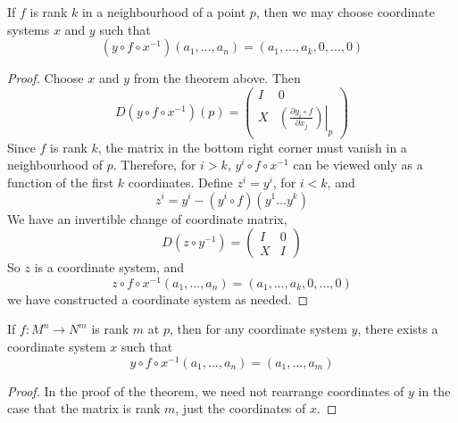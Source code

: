 \begin{corollary}
    If $f$ is rank $k$ in a neighbourhood of a point $p$, then we may choose coordinate systems $x$ and $y$ such that
    \[ (y \circ f \circ x^{-1})(a_1, \dots, a_n) = (a_1, \dots, a_k, 0, \dots, 0) \]
\end{corollary}
\begin{proof}
    Choose $x$ and $y$ from the theorem above. Then
    \[ D(y \circ f \circ x^{-1})(p) = \begin{pmatrix} I & 0 \\ X & \left.\left( \frac{\partial y_i \circ f}{\partial x_j} \right)\right|_p \end{pmatrix} \]
    Since $f$ is rank $k$, the matrix in the bottom right corner must vanish in a neighbourhood of $p$. Therefore, for $i > k$, $y^i \circ f \circ x^{-1}$ can be viewed only as a function of the first $k$ coordinates. Define $z^i = y^i$, for $i < k$, and
    \[ z^i = y^i - (y^i \circ f)(y^1 \dots y^k) \]
    We have an invertible change of coordinate matrix,
    \[ D(z \circ y^{-1}) = \begin{pmatrix} I & 0 \\ X & I \end{pmatrix} \]
    So $z$ is a coordinate system, and
    \[ z \circ f \circ x^{-1}(a_1, \dots, a_n) = (a_1, \dots, a_k, 0, \dots, 0) \]
    we have constructed a coordinate system as needed.
\end{proof}

\begin{corollary}
    If $f: M^n \to N^m$ is rank $m$ at $p$, then for any coordinate system $y$, there exists a coordinate system $x$ such that
    \[ y \circ f \circ x^{-1} (a_1, \dots, a_n) = (a_1, \dots, a_m) \]
\end{corollary}
\begin{proof}
    In the proof of the theorem, we need not rearrange coordinates of $y$ in the case that the matrix is rank $m$, just the coordinates of $x$.
\end{proof}

